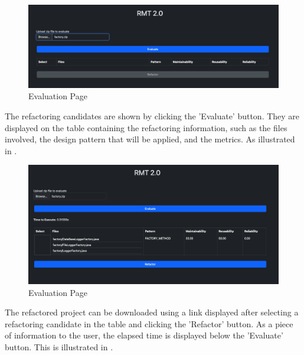 \begin{figure}[ht!]
\SetCaptionWidth{\textwidth}
\caption{Evaluation Page}
\label{fig-factory-selected}
\includegraphics[width =\textwidth]{Chapter-5/Figures/rmt-factory-client-selected.png}
\end{figure}
\FloatBarrier

The refactoring candidates are shown by clicking the 'Evaluate' button. They are displayed on the table containing the refactoring information, such as the files involved, the design pattern that will be applied, and the metrics. As illustrated in .

\begin{figure}[ht!]
\SetCaptionWidth{\textwidth}
\caption{Evaluation Page}
\label{fig-factory-evaluated}
\includegraphics[width =\textwidth]{Chapter-5/Figures/rmt-factory-evaluated.png}
\end{figure}
\FloatBarrier

The refactored project can be downloaded using a link displayed after selecting a refactoring candidate in the table and clicking the 'Refactor' button. As a piece of information to the user, the elapsed time is displayed below the 'Evaluate'
 button. This is illustrated in .


